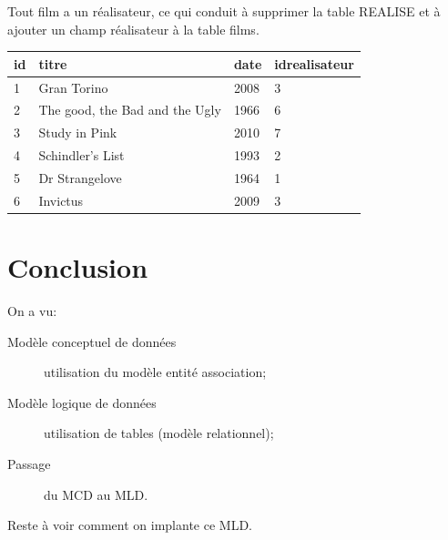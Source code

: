\begin{rem}
  Tout film a un réalisateur, ce qui conduit à supprimer la table
REALISE et à ajouter un champ réalisateur à la table films.

\begin{center}
\begin{tabular}{llll}
\toprule
id & titre & date & idrealisateur\\
\midrule
1 & Gran Torino & 2008 & 3\\
2 & The good, the Bad and the Ugly& 1966 & 6\\
3 & Study in Pink & 2010 & 7\\
4 & Schindler's List& 1993 & 2\\
5 & Dr Strangelove&1964 & 1\\
6 & Invictus & 2009 & 3\\
\bottomrule
\end{tabular}
\end{center}
\end{rem}


\section{Conclusion}

On a vu:
\begin{description}
\item[Modèle conceptuel de données] utilisation du modèle entité association;
\item[Modèle logique de données] utilisation de tables (modèle relationnel);
\item[Passage]  du MCD au MLD.
\end{description}

Reste à voir comment on implante ce MLD.






